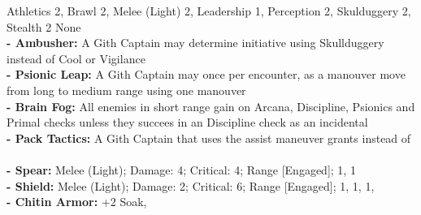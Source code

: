\Creature[name=Gith Captain, type=Rival, brawn=3, agility=3, presence=1, soak=3, wounds=6]{
} {
    Athletics 2, Brawl 2, Melee (Light) 2, Leadership 1, Perception 2, Skulduggery 2, Stealth 2
}{
    None
}{
    \\ %
    \textbf{- Ambusher:} A Gith Captain may determine initiative using Skullduggery instead of Cool or Vigilance\\
    \textbf{- Psionic Leap:} A Gith Captain may once per encounter, as a manouver move from long to medium range using one manouver\\
    \textbf{- Brain Fog:} All enemies in short range gain \setback on Arcana, Discipline, Psionics and Primal checks unless they succees in an Discipline check as an incidental\\
    \textbf{- Pack Tactics:} A Gith Captain that uses the assist maneuver grants \boost\boost instead of \boost\\
}{
    \\ %
    \textbf{- Spear:} Melee (Light); Damage: 4; Critical: 4; Range [Engaged];  1,  1\\
    \textbf{- Shield:} Melee (Light); Damage: 2; Critical: 6; Range [Engaged];  1,  1,  1, \\
    \textbf{- Chitin Armor:} +2 Soak, \\
}

